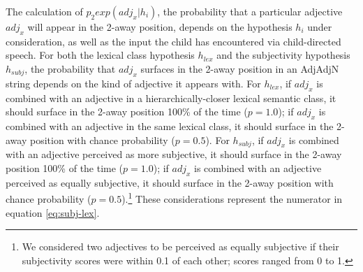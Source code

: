 \documentclass[10pt]{article}
\begin{document}

The calculation of $p_2exp(adj_x|h_i)$, the probability %
that a particular adjective $adj_x$ will appear in the 2-away position, depends on the hypothesis $h_i$ under consideration, as well as the input the child has encountered via child-directed speech. %
For both the lexical class hypothesis $h_{lex}$  and the subjectivity hypothesis $h_{subj}$, the probability that $adj_x$ surfaces in the 2-away position in an AdjAdjN string depends on the kind of adjective it appears with. 
For $h_{lex}$, if $adj_x$ is combined with an adjective in a hierarchically-closer lexical semantic class, it should surface in the 2-away position 100\% of the time ($p=1.0$); if $adj_x$ is combined with an adjective in the same lexical class, it should surface in the 2-away position with chance probability ($p=0.5$). 
For $h_{subj}$, if $adj_x$ is combined with an adjective perceived as more subjective, it should surface in the 2-away position 100\% of the time ($p=1.0$); if $adj_x$ is combined with an adjective perceived as equally subjective, it should surface in the 2-away position with chance probability ($p=0.5$).\footnote{
We considered two adjectives to be perceived as equally subjective if
their subjectivity scores were within 0.1 of each other; scores ranged from 0 to 1. %
}
These considerations represent the numerator in equation \eqref{eq:subj-lex}.
\end{document}
